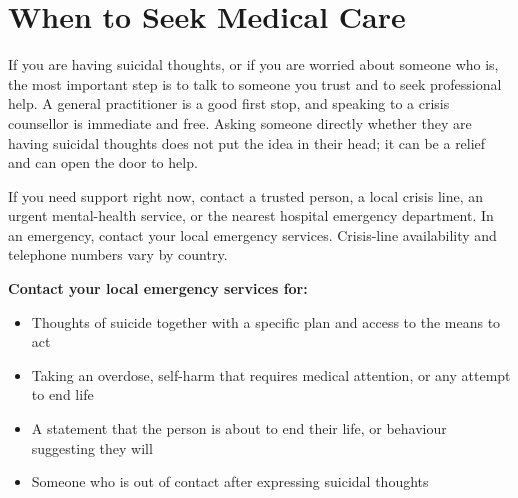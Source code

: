\section*{When to Seek Medical Care}
If you are having suicidal thoughts, or if you are worried about someone who is, the most important step is to talk to someone you trust and to seek professional help. A general practitioner is a good first stop, and speaking to a crisis counsellor is immediate and free. Asking someone directly whether they are having suicidal thoughts does not put the idea in their head; it can be a relief and can open the door to help.

If you need support right now, contact a trusted person, a local crisis line, an urgent mental-health service, or the nearest hospital emergency department. In an emergency, contact your local emergency services. Crisis-line availability and telephone numbers vary by country.

\textbf{Contact your local emergency services for:}
\begin{itemize}
    \item Thoughts of suicide together with a specific plan and access to the means to act
    \item Taking an overdose, self-harm that requires medical attention, or any attempt to end life
    \item A statement that the person is about to end their life, or behaviour suggesting they will
    \item Someone who is out of contact after expressing suicidal thoughts
\end{itemize}

